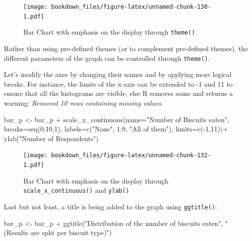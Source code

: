 \documentclass[
]{krantz}
\makeatletter
\newenvironment{Shaded}{\begin{snugshade}}{\end{snugshade}}
\newcommand{\AttributeTok}[1]{\textcolor[rgb]{0.61,0.61,0.61}{#1}}
\newcommand{\DecValTok}[1]{\textcolor[rgb]{0.06,0.06,0.06}{#1}}
\newcommand{\FunctionTok}[1]{\textcolor[rgb]{0,0,0}{#1}}
\newcommand{\NormalTok}[1]{#1}
\newcommand{\OtherTok}[1]{\textcolor[rgb]{0.37,0.37,0.37}{#1}}
\newcommand{\SpecialCharTok}[1]{\textcolor[rgb]{0,0,0}{#1}}
\newcommand{\StringTok}[1]{\textcolor[rgb]{0.5,0.5,0.5}{#1}}
\newenvironment{kframe}{%
\medskip{}
\setlength{\fboxsep}{.8em}
 \def\at@end@of@kframe{}%
 \ifinner\ifhmode%
  \def\at@end@of@kframe{\end{minipage}}%
  \begin{minipage}{\columnwidth}%
 \fi\fi%
 \def\FrameCommand##1{\hskip\@totalleftmargin \hskip-\fboxsep
 \colorbox{shadecolor}{##1}\hskip-\fboxsep
     \hskip-\linewidth \hskip-\@totalleftmargin \hskip\columnwidth}%
 \MakeFramed {\advance\hsize-\width
   \@totalleftmargin\z@ \linewidth\hsize
   \@setminipage}}%
 {\par\unskip\endMakeFramed%
 \at@end@of@kframe}
\renewenvironment{Shaded}{\begin{kframe}}{\end{kframe}}
\makeatother
\begin{document}
\begin{figure}
\centering
\texttt{[image: bookdown\_files/figure-latex/unnamed-chunk-130-1.pdf]}
\caption{\label{fig:unnamed-chunk-130}Bar Chart with emphasis on the display through \texttt{theme()}}
\end{figure}

Rather than using pre-defined themes (or to complement pre-defined themes), the different parameters of the graph can be controlled through \texttt{theme()}.

Let's modify the axes by changing their names and by applying more logical breaks. For instance, the limits of the x-axis can be extended to -1 and 11 to ensure that all the histograms are visible, else R removes some and returns a warning: \emph{Removed 10 rows containing missing values}.

\begin{Shaded}
\begin{Highlighting}[]
\NormalTok{bar\_p }\OtherTok{\textless{}{-}}\NormalTok{ bar\_p }\SpecialCharTok{+}
  \FunctionTok{scale\_x\_continuous}\NormalTok{(}\AttributeTok{name=}\StringTok{"Number of Biscuits eaten"}\NormalTok{, }
                     \AttributeTok{breaks=}\FunctionTok{seq}\NormalTok{(}\DecValTok{0}\NormalTok{,}\DecValTok{10}\NormalTok{,}\DecValTok{1}\NormalTok{), }
                     \AttributeTok{labels=}\FunctionTok{c}\NormalTok{(}\StringTok{"None"}\NormalTok{, }\DecValTok{1}\SpecialCharTok{:}\DecValTok{9}\NormalTok{, }\StringTok{"All of them"}\NormalTok{), }
                     \AttributeTok{limits=}\FunctionTok{c}\NormalTok{(}\SpecialCharTok{{-}}\DecValTok{1}\NormalTok{,}\DecValTok{11}\NormalTok{))}\SpecialCharTok{+}
  \FunctionTok{ylab}\NormalTok{(}\StringTok{"Number of Respondents"}\NormalTok{)}
\end{Highlighting}
\end{Shaded}

\begin{figure}
\centering
\texttt{[image: bookdown\_files/figure-latex/unnamed-chunk-132-1.pdf]}
\caption{\label{fig:unnamed-chunk-132}Bar Chart with emphasis on the display through \texttt{scale\_x\_continuous()} and \texttt{ylab()}}
\end{figure}

Last but not least, a title is being added to the graph using \texttt{ggtitle()}:

\begin{Shaded}
\begin{Highlighting}[]
\NormalTok{bar\_p }\OtherTok{\textless{}{-}}\NormalTok{ bar\_p }\SpecialCharTok{+}
  \FunctionTok{ggtitle}\NormalTok{(}\StringTok{"Distribution of the number of biscuits eaten"}\NormalTok{,}
          \StringTok{"(Results are split per biscuit type)"}\NormalTok{)}
\end{Highlighting}
\end{Shaded}
\end{document}
